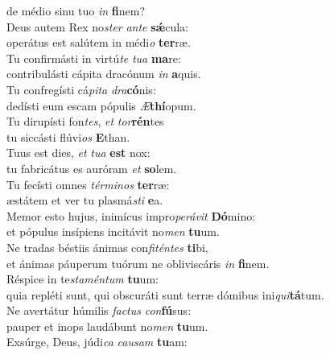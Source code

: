 \evenverse de médio sinu tuo \textit{in} \textbf{fi}nem?\\
\oddverse Deus autem Rex no\textit{ster} \textit{an}\textit{te} \textbf{sǽ}cula:~\*\\
\oddverse operátus est salútem in médi\textit{o} \textbf{ter}ræ.\\
\evenverse Tu confirmásti in virtú\textit{te} \textit{tu}\textit{a} \textbf{ma}re:~\*\\
\evenverse contribulásti cápita dracónum \textit{in} \textbf{a}quis.\\
\oddverse Tu confregísti cá\textit{pi}\textit{ta} \textit{dra}\textbf{có}nis:~\*\\
\oddverse dedísti eum escam pópulis \textit{Æ}\textbf{thí}opum.\\
\evenverse Tu dirupísti fon\textit{tes}, \textit{et} \textit{tor}\textbf{rén}tes~\*\\
\evenverse tu siccásti flúvi\textit{os} \textbf{E}than.\\
\oddverse Tuus est dies, \textit{et} \textit{tu}\textit{a} \textbf{est} nox:~\*\\
\oddverse tu fabricátus es auróram \textit{et} \textbf{so}lem.\\
\evenverse Tu fecísti omnes \textit{tér}\textit{mi}\textit{nos} \textbf{ter}ræ:~\*\\
\evenverse æstátem et ver tu plasmá\textit{sti} \textbf{e}a.\\
\oddverse Memor esto hujus, inimícus impro\textit{pe}\textit{rá}\textit{vit} \textbf{Dó}mino:~\*\\
\oddverse et pópulus insípiens incitávit no\textit{men} \textbf{tu}um.\\
\evenverse Ne tradas béstiis ánimas con\textit{fi}\textit{tén}\textit{tes} \textbf{ti}bi,~\*\\
\evenverse et ánimas páuperum tuórum ne obliviscáris \textit{in} \textbf{fi}nem.\\
\oddverse Réspice in te\textit{sta}\textit{mén}\textit{tum} \textbf{tu}um:~\*\\
\oddverse quia repléti sunt, qui obscuráti sunt terræ dómibus ini\textit{qui}\textbf{tá}tum.\\
\evenverse Ne avertátur húmilis \textit{fa}\textit{ctus} \textit{con}\textbf{fú}sus:~\*\\
\evenverse pauper et inops laudábunt no\textit{men} \textbf{tu}um.\\
\oddverse Exsúrge, Deus, júdi\textit{ca} \textit{cau}\textit{sam} \textbf{tu}am:~\*\\
